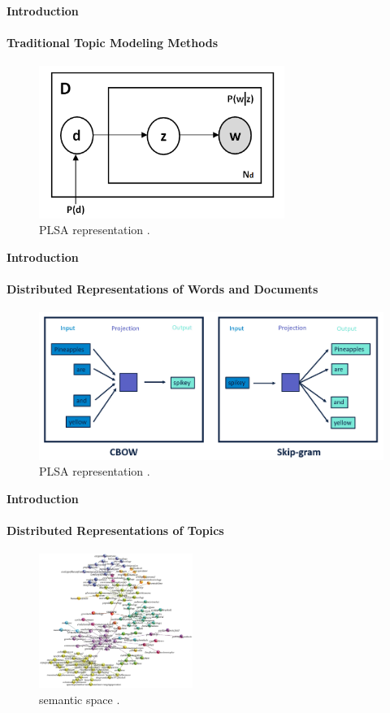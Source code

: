 \begin{frame}[fragile=singleslide]{\large \textbf{Introduction}}
  \framesubtitle{Traditional Topic Modeling Methods}
  \begin{figure}[ht!]
    \includegraphics[width=8cm]{Graphics/plsa.png}
    \caption{PLSA representation \cite{Alghamdi_2015}.}
  \end{figure}
\end{frame}

\begin{frame}[fragile=singleslide]{\large \textbf{Introduction}}
  \framesubtitle{Distributed Representations of Words and Documents}
  \begin{figure}[ht!]
    \includegraphics[width=12cm]{Graphics/word2vec.png}
    \caption{PLSA representation \cite{Alghamdi_2015}.}
  \end{figure}
\end{frame}

\begin{frame}[fragile=singleslide]{\large \textbf{Introduction}}
  \framesubtitle{Distributed Representations of Topics}
  \begin{figure}[ht!]
    \includegraphics[width=5cm]{Graphics/semantic_space.jpg}
    \caption{semantic space \cite{Masucci_2011}.}
  \end{figure}
\end{frame}

